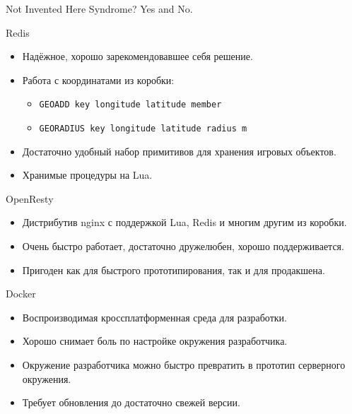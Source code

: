 \documentclass[aspectratio=169,handout,bigger]{beamer}
\begin{document}

\begin{frame}{Not Invented Here Syndrome?}
  Yes and No.
\end{frame}


\begin{frame}{Redis}
  \begin{itemize}
    \item Надёжное, хорошо зарекомендовавшее себя решение.
    \item Работа с координатами из коробки:
    \begin{itemize}
      \item \texttt{GEOADD key longitude latitude member}
      \item \texttt{GEORADIUS key longitude latitude radius m}
    \end{itemize}
    \item Достаточно удобный набор примитивов для хранения игровых объектов.
    \item Хранимые процедуры на Lua.
  \end{itemize}
\end{frame}


\begin{frame}{OpenResty}
  \begin{itemize}
    \item Дистрибутив nginx с поддержкой Lua, Redis и многим другим из коробки.
    \item Очень быстро работает, достаточно дружелюбен, хорошо поддерживается.
    \item Пригоден как для быстрого прототипирования, так и для продакшена.
  \end{itemize}
\end{frame}


\begin{frame}{Docker}
  \begin{itemize}
    \item Воспроизводимая кроссплатформенная среда для разработки.
    \item Хорошо снимает боль по настройке окружения разработчика.
    \item Окружение разработчика можно быстро превратить в прототип серверного окружения.
    \item Требует обновления до достаточно свежей версии.
  \end{itemize}
\end{frame}
\end{document}
